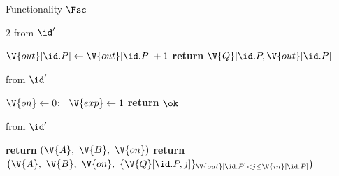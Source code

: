 \begin{interface}[nofloat]{Functionality $\Fsc$ \\
\params{$\PID$, \quad $\Ps$, \quad $\admits$, \quad
$\uses := \{(\Adv,\serves)\}$, \quad $\pars := \none$}}
{\begin{multicols}{2}
 \quad from $\id'$
\begin{algorithmic}[1]
\algcont
{} \label{ln:scdeliver}
\State $\V{out}[\id.P] \gets \V{out}[\id.P] + 1$
\State \textbf{return} $\V{Q}[\id.P, \V{out}[\id.P]]$
\algsave
\end{algorithmic}
\vspace{1.4ex}

 \quad from $\id'$
\begin{algorithmic}[1]
\algcont
{}
\State $\V{on} \gets 0$; \ $\V{exp} \gets 1$ \label{ln:scexpire}
\State \textbf{return} $\ok$
\algsave
\end{algorithmic}
\vspace{1.4ex}

 \quad from $\id'$
\begin{algorithmic}[1]
\algcont
{}
  \State \textbf{return} $(\V{A},\ \V{B},\ \V{on})$ \label{ln:scoutsider}
\EndIf
\State \textbf{return} $\bigl(\V{A},\ \V{B},\ \V{on},\ \{\V{Q}[\id.P, j]\}_{\V{out}[\id.P] < j \leq \V{in}[\id.P]}\bigr)$ \label{ln:scpending}
\algsave
\end{algorithmic}
\end{multicols}}
\end{interface}

